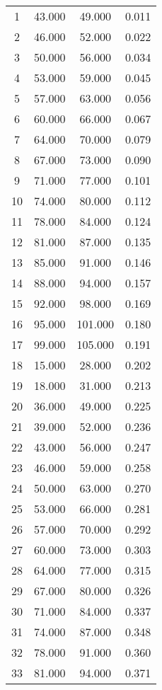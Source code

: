 % 
\begin{tabular}{cccc}
  \hline
  \hline
1 & 43.000 & 49.000 & 0.011 \\ 
  2 & 46.000 & 52.000 & 0.022 \\ 
  3 & 50.000 & 56.000 & 0.034 \\ 
  4 & 53.000 & 59.000 & 0.045 \\ 
  5 & 57.000 & 63.000 & 0.056 \\ 
  6 & 60.000 & 66.000 & 0.067 \\ 
  7 & 64.000 & 70.000 & 0.079 \\ 
  8 & 67.000 & 73.000 & 0.090 \\ 
  9 & 71.000 & 77.000 & 0.101 \\ 
  10 & 74.000 & 80.000 & 0.112 \\ 
  11 & 78.000 & 84.000 & 0.124 \\ 
  12 & 81.000 & 87.000 & 0.135 \\ 
  13 & 85.000 & 91.000 & 0.146 \\ 
  14 & 88.000 & 94.000 & 0.157 \\ 
  15 & 92.000 & 98.000 & 0.169 \\ 
  16 & 95.000 & 101.000 & 0.180 \\ 
  17 & 99.000 & 105.000 & 0.191 \\ 
  18 & 15.000 & 28.000 & 0.202 \\ 
  19 & 18.000 & 31.000 & 0.213 \\ 
  20 & 36.000 & 49.000 & 0.225 \\ 
  21 & 39.000 & 52.000 & 0.236 \\ 
  22 & 43.000 & 56.000 & 0.247 \\ 
  23 & 46.000 & 59.000 & 0.258 \\ 
  24 & 50.000 & 63.000 & 0.270 \\ 
  25 & 53.000 & 66.000 & 0.281 \\ 
  26 & 57.000 & 70.000 & 0.292 \\ 
  27 & 60.000 & 73.000 & 0.303 \\ 
  28 & 64.000 & 77.000 & 0.315 \\ 
  29 & 67.000 & 80.000 & 0.326 \\ 
  30 & 71.000 & 84.000 & 0.337 \\ 
  31 & 74.000 & 87.000 & 0.348 \\ 
  32 & 78.000 & 91.000 & 0.360 \\ 
  33 & 81.000 & 94.000 & 0.371 \\ 

\end{tabular}
